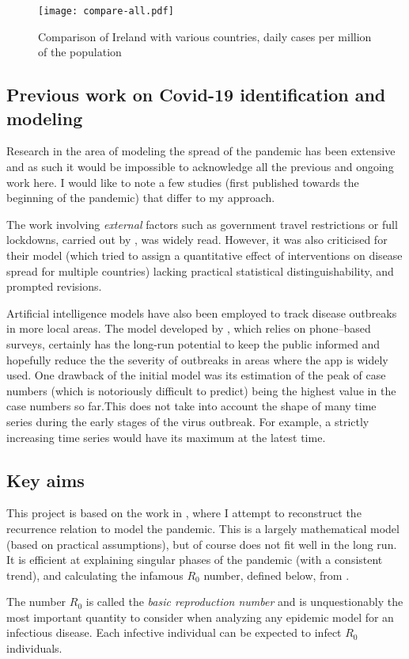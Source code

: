 \begin{figure}[H]
\texttt{[image: compare-all.pdf]}
\endminipage
\caption{Comparison of Ireland with various countries, daily cases per million of the population}
\end{figure}




\subsection{Previous work on Covid-19 identification and modeling}
Research in the area of modeling the spread of the pandemic has been extensive and as such it would be impossible to acknowledge all the previous and ongoing work here. I would like to note a few studies (first published towards the beginning of the pandemic) that differ to my approach.

The work involving \textit{external} factors such as government travel restrictions or full lockdowns, carried out by \cite{flaxman20}, was widely read. However, it was also criticised for their model (which tried to assign a quantitative effect of interventions on disease spread for multiple countries) lacking practical statistical distinguishability, and prompted revisions.

Artificial intelligence models have also been employed to track disease outbreaks in more local areas. The model developed by \cite{SrinivasaRao2020}, which relies on phone–based surveys, certainly has the long-run potential to keep the public informed and hopefully reduce the the severity of outbreaks in areas where the app is widely used. One drawback of the initial model was its estimation of the peak of case numbers (which is notoriously difficult to predict) being the highest value in the case numbers so far.This does not take into account the shape of many time series during the early stages of the virus outbreak. For example, a strictly increasing time series would have its maximum at the latest time.


\subsection{Key aims}

This project is based on the work in \cite{grigor20}, where I attempt to reconstruct the recurrence relation to model the pandemic. This is a largely mathematical model (based on practical assumptions), but of course does not fit well in the long run. It is efficient at explaining singular phases of the pandemic (with a consistent trend), and calculating the infamous $R_0$ number, defined below, from \cite{epid08}. 

\begin{ndefinition} 
The number $R_0$ is called
the \textit{basic reproduction number} and is unquestionably the most important quantity to consider when analyzing any epidemic model for an infectious disease. Each infective individual can be expected to infect $R_0$ individuals. 
\end{ndefinition}

